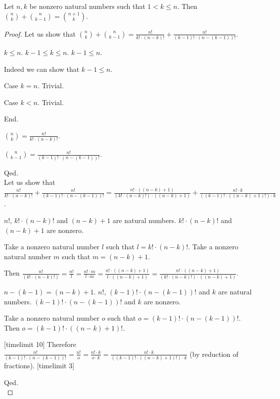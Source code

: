 \documentclass{article}
\begin{document}
\begin{forthel}
\begin{theorem}
Let $n,k$ be nonzero natural numbers such that $1 < k \leq n$.
Then $\binom{n}{k} + \binom{n}{k-1} = \binom{n+1}{k}$.
\end{theorem}
\begin{proof}
	
Let us show that
$\binom{n}{k} + \binom{n}{k-1} = \frac{n!}{k! \cdot (n-k)!} + \frac{n!}{(k-1)! \cdot (n-(k-1))!}$.

$k \leq n$.
$k-1 \leq k \leq n$.
$k-1 \leq n$.

Indeed we can show that $k-1 \leq n$.

Case $k = n$. Trivial.

Case $k < n$. Trivial.

End.

$\binom{n}{k} = \frac{n!}{k! \cdot (n-k)!}$.

$\binom{n}{k-1} = \frac{n!}{(k-1)! \cdot (n-(k-1))!}$.

Qed.
\\
 
Let us show that \\
$\frac{n!}{k! \cdot (n-k)!} + \frac{n!}{(k-1)! \cdot (n-(k-1))!} = 
\frac{n! \cdot ((n-k)+1)}{(k! \cdot (n-k)!) \cdot ((n-k)+1) } + 
\frac{n! \cdot k}{((k-1)! \cdot ((n-k)+1)!) \cdot k}$.

$n!$, $k! \cdot (n-k)!$ and $(n-k)+1$ are natural numbers.
$k! \cdot (n-k)!$ and $(n-k)+1$ are nonzero.

Take a nonzero natural number $l$ such that $l = k! \cdot (n-k)!$.
Take a nonzero natural number $m$ such that $m = (n-k)+1$.

Then $\frac{n!}{(k! \cdot (n-k)!)} = \frac{n!}{l} = \frac{n! \cdot m}{l \cdot m} = 
\frac{n! \cdot ((n-k)+1)}{l \cdot ((n-k)+1) } =  \frac{n! \cdot ((n-k)+1)}{(k! \cdot (n-k)!) \cdot ((n-k)+1) }$.

$n-(k-1) = (n-k) +1$.
$n!$, $(k-1)! \cdot (n-(k-1))!$ and $k$ are natural numbers.
$(k-1)! \cdot (n-(k-1))!$ and $k$ are nonzero.

Take a nonzero natural number $o$ such that $o = (k-1)! \cdot (n-(k-1))!$.
Then $o = (k-1)! \cdot ((n-k)+1)!$.

[timelimit 10]
Therefore $\frac{n!}{(k-1)! \cdot (n-(k-1))!} = \frac{n!}{o} = \frac{n! \cdot k}{o \cdot k}
= \frac{n! \cdot k}{((k-1)! \cdot ((n-k)+1)!) \cdot k}$ (by reduction of fractions).
[timelimit 3]

Qed.
\\
  

\end{proof}
\end{forthel}
\end{document}
